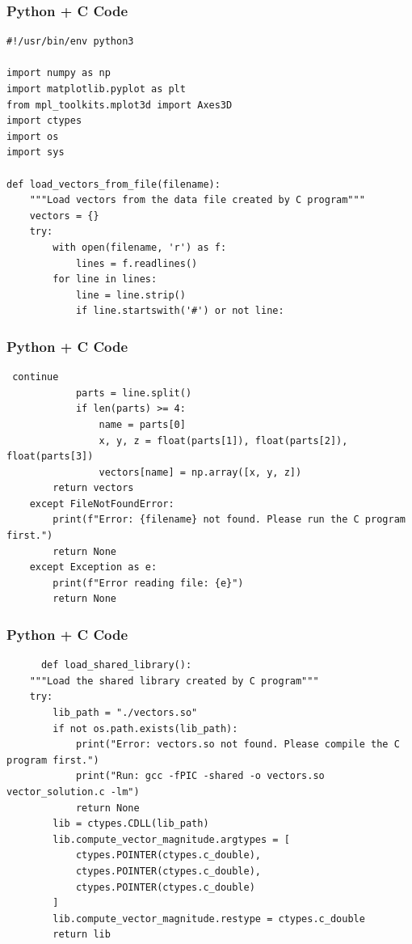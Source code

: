\documentclass{beamer}
\begin{document}
\begin{frame}[fragile]
    \frametitle{Python + C Code}
    \begin{lstlisting}
#!/usr/bin/env python3

import numpy as np
import matplotlib.pyplot as plt
from mpl_toolkits.mplot3d import Axes3D
import ctypes
import os
import sys

def load_vectors_from_file(filename):
    """Load vectors from the data file created by C program"""
    vectors = {}
    try:
        with open(filename, 'r') as f:
            lines = f.readlines()
        for line in lines:
            line = line.strip()
            if line.startswith('#') or not line:
\end{lstlisting}
\end{frame}

\begin{frame}[fragile]
    \frametitle{Python + C Code}
    \begin{lstlisting}
 continue
            parts = line.split()
            if len(parts) >= 4:
                name = parts[0]
                x, y, z = float(parts[1]), float(parts[2]), float(parts[3])
                vectors[name] = np.array([x, y, z])
        return vectors
    except FileNotFoundError:
        print(f"Error: {filename} not found. Please run the C program first.")
        return None
    except Exception as e:
        print(f"Error reading file: {e}")
        return None
    \end{lstlisting}
\end{frame}

\begin{frame}[fragile]
    \frametitle{Python + C Code}
    \begin{lstlisting}   
      def load_shared_library():
    """Load the shared library created by C program"""
    try:
        lib_path = "./vectors.so"
        if not os.path.exists(lib_path):
            print("Error: vectors.so not found. Please compile the C program first.")
            print("Run: gcc -fPIC -shared -o vectors.so vector_solution.c -lm")
            return None
        lib = ctypes.CDLL(lib_path)
        lib.compute_vector_magnitude.argtypes = [
            ctypes.POINTER(ctypes.c_double),
            ctypes.POINTER(ctypes.c_double),
            ctypes.POINTER(ctypes.c_double)
        ]
        lib.compute_vector_magnitude.restype = ctypes.c_double
        return lib
    \end{lstlisting}
\end{frame}
\end{document}
